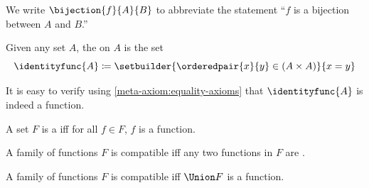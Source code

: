 \begin{notation}
    We write \( \bijection{f}{A}{B} \) to abbreviate the statement ``\( f \) is a bijection between \( A \) and \( B \).''
\end{notation}

\begin{dfn}[Identity]
     \label{dfn:metatheory-identity-function}
    Given any set \( A \), the  on \( A \) is the set
    \begin{equation*}
        \identityfunc{A} \coloneq
        \setbuilder{\orderedpair{x}{y} \in \mleft( A \times A \mright)}{x = y}
    \end{equation*}
\end{dfn}

\begin{rem}
    It is easy to verify using \cref{meta-axiom:equality-axioms} that \( \identityfunc{A} \) is indeed a function.
\end{rem}

\begin{dfn}
     \label{dfn:metatheory-family-of-functions}
    A set \( F \) is a  iff for all \( f \in F \), \( f \) is a function.
\end{dfn}

\begin{dfn}[Compatibility]
     \label{dfn:metatheory-compatibility-of-functions}
    A family of functions \( F \) is compatible iff any two functions in \( F \)
    are .
\end{dfn}

\begin{thm}
     \label{thm:metatheory-a-family-of-functions-is-compatible-iff-its-union-is-a-function}
    A family of functions \( F \) is compatible iff \( \Union F \) is a function.
\end{thm}

